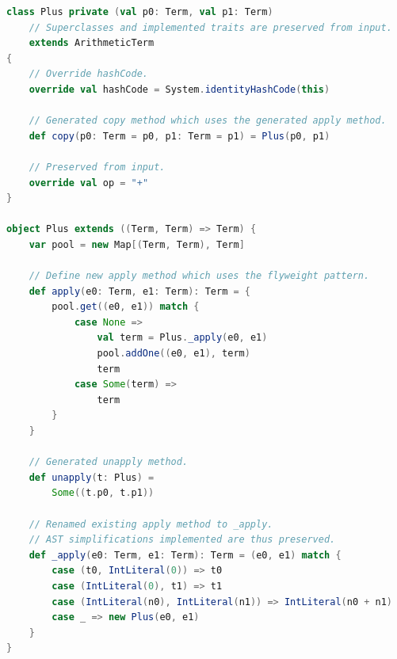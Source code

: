 \documentclass[11pt]{article}
\begin{document}
    \begin{lstlisting}[language=Scala, caption={Output code generated by our macro.}, label={lst:macro-output}]
class Plus private (val p0: Term, val p1: Term)
    // Superclasses and implemented traits are preserved from input.
    extends ArithmeticTerm
{
    // Override hashCode.
    override val hashCode = System.identityHashCode(this)

    // Generated copy method which uses the generated apply method.
    def copy(p0: Term = p0, p1: Term = p1) = Plus(p0, p1)

    // Preserved from input.
    override val op = "+"
}

object Plus extends ((Term, Term) => Term) {
    var pool = new Map[(Term, Term), Term]

    // Define new apply method which uses the flyweight pattern.
    def apply(e0: Term, e1: Term): Term = {
        pool.get((e0, e1)) match {
            case None => 
                val term = Plus._apply(e0, e1)
                pool.addOne((e0, e1), term)
                term
            case Some(term) => 
                term
        }
    }

    // Generated unapply method.
    def unapply(t: Plus) =
        Some((t.p0, t.p1))

    // Renamed existing apply method to _apply.
    // AST simplifications implemented are thus preserved.
    def _apply(e0: Term, e1: Term): Term = (e0, e1) match {
        case (t0, IntLiteral(0)) => t0
        case (IntLiteral(0), t1) => t1
        case (IntLiteral(n0), IntLiteral(n1)) => IntLiteral(n0 + n1)
        case _ => new Plus(e0, e1)
    }
}       
    \end{lstlisting}




\end{document}
